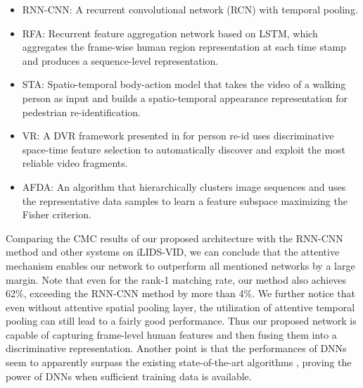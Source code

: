 \documentclass[10pt,twocolumn,letterpaper]{article}
\begin{document}
 \begin{itemize}
 \item RNN-CNN: A recurrent convolutional network (RCN) \cite{C_RNN} with temporal pooling. 
 
 \item RFA: Recurrent feature aggregation network \cite{RFA} based on LSTM, which aggregates the frame-wise human region representation at each time stamp and produces a sequence-level representation.
 
 
 \item STA: Spatio-temporal body-action model that takes the video of a walking person as input and builds a spatio-temporal appearance representation for pedestrian re-identification. 
 
 \item VR: A DVR framework presented in \cite{video_ranking} for person re-id uses discriminative space-time feature selection to automatically discover and exploit the most reliable video fragments. 
 

 \item AFDA: An algorithm \cite{AFDA} that hierarchically clusters image sequences and uses the representative data samples to learn a feature subspace maximizing the Fisher criterion.
 
 
 \end{itemize}
 
 Comparing the CMC results of our proposed architecture with the RNN-CNN method and other systems on iLIDS-VID, we can conclude that the attentive mechanism enables our network to outperform all mentioned networks by a large margin. Note that even for the rank-1 matching rate, our method also achieves 62\%, exceeding the RNN-CNN method by more than 4\%. We further notice that even without attentive spatial pooling layer, the utilization of attentive temporal pooling can still lead to a fairly good performance. Thus our proposed network is capable of capturing frame-level human features and then fusing them into a discriminative representation. Another point is that the performances of DNNs seem to apparently surpass the existing state-of-the-art algorithms \cite{SRID,AFDA,DTDL}, proving the power of DNNs when sufficient training data is available.
 
\end{document}
